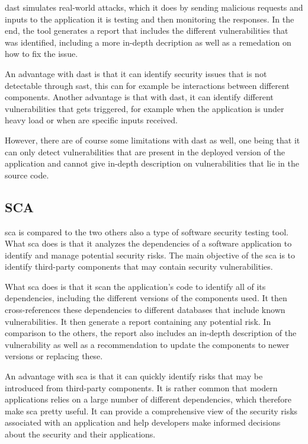 \acrshort{dast} simulates real-world attacks, which it does by sending malicious requests and inputs to the application it is testing and then monitoring the responses. In the end, the tool generates a report that includes the different vulnerabilities that was identified, including a more in-depth decription as well as a remedation on how to fix the issue. \cite{dast}

An advantage with \acrshort{dast} is that it can identify security issues that is not detectable through \acrshort{sast}, this can for example be interactions between different components. Another advantage is that with \acrshort{dast}, it can identify different vulnerabilities that gets triggered, for example when the application is under heavy load or when are specific inputs received.

However, there are of course some limitations with \acrshort{dast} as well, one being that it can only detect vulnerabilities that are present in the deployed version of the application and cannot give in-depth description on vulnerabilities that lie in the source code.

\subsection{SCA}
\acrlong{sca} is compared to the two others also a type of software security testing tool. What \acrshort{sca} does is that it analyzes the dependencies of a software application to identify and manage potential security risks. The main objective of the \acrshort{sca} is to identify third-party components that may contain security vulnerabilities. \cite{sca}

What \acrshort{sca} does is that it scan the application's code to identify all of its dependencies, including the different versions of the components used. It then cross-references these dependencies to different databases that include known vulnerabilities. It then generate a report containing any potential risk. In comparison to the others, the report also includes an in-depth description of the vulnerability as well as a recommendation to update the components to newer versions or replacing these. 

An advantage with \acrshort{sca} is that it can quickly identify risks that may be introduced from third-party components. It is rather common that modern applications relies on a large number of  different dependencies, which therefore make \acrshort{sca} pretty useful. It can provide a comprehensive view of the security risks associated with an application and help developers make informed decisions about the security and their applications. 

